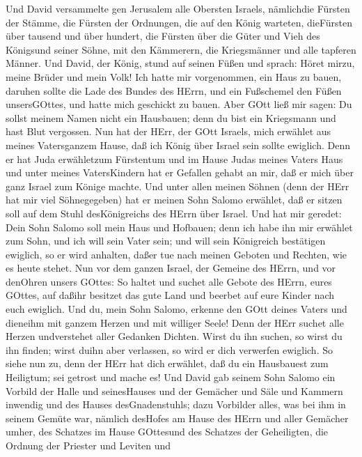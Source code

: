  Und David versammelte gen Jerusalem alle Obersten Israels,
nämlichdie Fürsten der Stämme, die Fürsten der Ordnungen, die auf den
König warteten, dieFürsten über tausend und über hundert, die Fürsten
über die Güter und Vieh des Königsund seiner Söhne, mit den Kämmerern,
die Kriegsmänner und alle tapferen Männer.  Und David, der
König, stund auf seinen Füßen und sprach: Höret mirzu, meine Brüder und
mein Volk! Ich hatte mir vorgenommen, ein Haus zu bauen, daruhen sollte
die Lade des Bundes des HErrn, und ein Fußschemel den Füßen
unsersGOttes, und hatte mich geschickt zu bauen.  Aber GOtt
ließ mir sagen: Du sollst meinem Namen nicht ein Hausbauen; denn du bist
ein Kriegsmann und hast Blut vergossen.  Nun hat der HErr,
der GOtt Israels, mich erwählet aus meines Vatersganzem Hause, daß ich
König über Israel sein sollte ewiglich. Denn er hat Juda erwähletzum
Fürstentum und im Hause Judas meines Vaters Haus und unter meines
VatersKindern hat er Gefallen gehabt an mir, daß er mich über ganz
Israel zum Könige machte.  Und unter allen meinen Söhnen
(denn der HErr hat mir viel Söhnegegeben) hat er meinen Sohn Salomo
erwählet, daß er sitzen soll auf dem Stuhl desKönigreichs des HErrn über
Israel.  Und hat mir geredet: Dein Sohn Salomo soll mein
Haus und Hofbauen; denn ich habe ihn mir erwählet zum Sohn, und ich will
sein Vater sein;  und will sein Königreich bestätigen
ewiglich, so er wird anhalten, daßer tue nach meinen Geboten und
Rechten, wie es heute stehet.  Nun vor dem ganzen Israel,
der Gemeine des HErrn, und vor denOhren unsers GOttes: So haltet und
suchet alle Gebote des HErrn, eures GOttes, auf daßihr besitzet das gute
Land und beerbet auf eure Kinder nach euch ewiglich.  Und
du, mein Sohn Salomo, erkenne den GOtt deines Vaters und dieneihm mit
ganzem Herzen und mit williger Seele! Denn der HErr suchet alle Herzen
undverstehet aller Gedanken Dichten. Wirst du ihn suchen, so wirst du
ihn finden; wirst duihn aber verlassen, so wird er dich verwerfen
ewiglich.  So siehe nun zu, denn der HErr hat dich
erwählet, daß du ein Hausbauest zum Heiligtum; sei getrost und mache es!
 Und David gab seinem Sohn Salomo ein Vorbild der Halle und
seinesHauses und der Gemächer und Säle und Kammern inwendig und des
Hauses desGnadenstuhls;  dazu Vorbilder alles, was bei ihm
in seinem Gemüte war, nämlich desHofes am Hause des HErrn und aller
Gemächer umher, des Schatzes im Hause GOttesund des Schatzes der
Geheiligten,  die Ordnung der Priester und Leviten und

